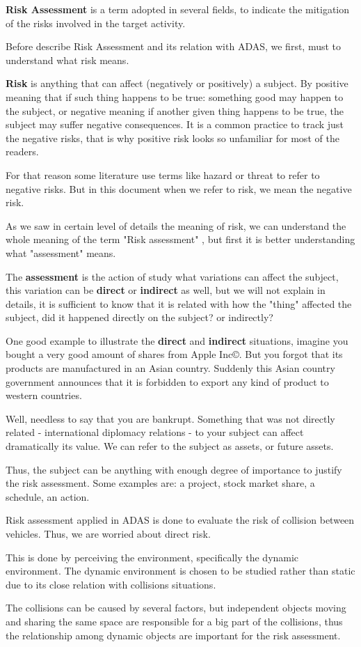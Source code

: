 \textbf{Risk Assessment} is a term adopted in several fields, to indicate the mitigation of the risks involved in the target activity. 

Before describe Risk Assessment and its relation with ADAS, we first, must to understand what risk means.

\textbf{Risk} is anything that can affect (negatively or positively) a subject. By positive meaning that if such thing happens to be true: something good may happen to the subject, or negative meaning if another given thing happens to be true, the subject may suffer negative consequences. It is a common practice to track just the negative risks, that is why positive risk looks so unfamiliar for most of the readers. 

For that reason some literature use terms like hazard or threat to refer to negative risks. But in this document when we refer to risk, we mean the negative risk.

As we saw in certain level of details the meaning of risk, we can understand the whole meaning of the term "Risk assessment" , but first it is better understanding what "assessment" means.

The \textbf{assessment} is the action of study what variations can affect the subject, this variation can be \textbf{direct} or \textbf{indirect} as well, but we will not explain in details, it is sufficient to know that it is related with how the "thing" affected the subject, did it happened directly on the subject? or indirectly?

One good example to illustrate the \textbf{direct} and \textbf{indirect} situations, imagine you bought a very good amount of shares from Apple Inc\copyright. But you forgot that its products are manufactured in an Asian country. Suddenly this Asian country government announces that it is forbidden to export any kind of product to western countries. 

Well, needless to say that you are bankrupt. Something that was not directly related - international diplomacy relations - to your subject can affect dramatically its value. We can refer to the subject as assets, or future assets.

Thus, the subject can be anything with enough degree of importance to justify the risk assessment. Some examples are: a project, stock market share, a schedule, an action.

Risk assessment applied in ADAS is done to evaluate the risk of collision between vehicles. Thus, we are worried about direct risk. 

This is done by perceiving the environment, specifically the dynamic environment. The dynamic environment is chosen to be studied rather than static due to its close relation with  collisions situations. 

The collisions can be caused by several factors, but independent objects moving and sharing the same space are responsible for a big part of the collisions, thus the relationship among dynamic objects are important for the risk assessment.
